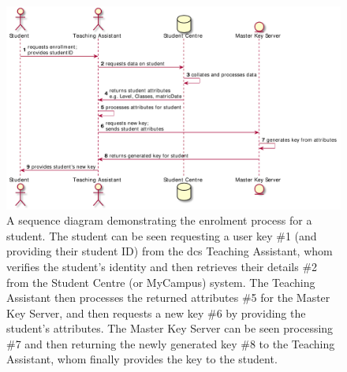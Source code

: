 \begin{figure}[htp]
    \centering
    \includegraphics[width=\linewidth,keepaspectratio]{images/flow_of_info/enrollment_stu_sequence.pdf}

    \caption{A sequence diagram demonstrating the \theResServer enrolment process for a student.
    The student can be seen requesting a user key \#1 (and providing their student ID) from the \acrshort{dcs} Teaching Assistant, whom verifies the student's identity and then retrieves their details \#2 from the Student Centre (or MyCampus) system. The Teaching Assistant then processes the returned attributes \#5 for the Master Key Server, and then requests a new key \#6 by providing the student's attributes. The Master Key Server can be seen processing \#7 and then returning the newly generated key \#8 to the Teaching Assistant, whom finally provides the key to the student.}

    \label{fig:enrolment_diagram}
\end{figure}
